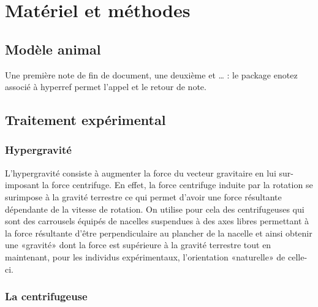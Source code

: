 \section{Matériel et méthodes}

	\subsection{Modèle animal}

	\lipsum[1]

	Une première note de fin de document, une deuxième et \ldots {}      : le package enotez associé à hyperref permet l'appel et le retour de note.

	\subsection{Traitement expérimental}

		\subsubsection{Hypergravité}
		\label{hypergravite} %

		L'hypergravité consiste à augmenter la force du vecteur gravitaire en lui sur-imposant la force centrifuge. En effet, la force centrifuge induite par la rotation se surimpose à la gravité terrestre ce qui permet d'avoir une force résultante dépendante de la vitesse de rotation. On utilise pour cela des centrifugeuses qui sont des carrousels équipés de nacelles suspendues à des axes libres permettant à la force résultante d'être perpendiculaire au plancher de la nacelle et ainsi obtenir une «gravité» dont la force est supérieure à la gravité terrestre tout en maintenant, pour les individus expérimentaux, l'orientation «naturelle» de celle-ci. %
		
		\subsubsection{La centrifugeuse}

